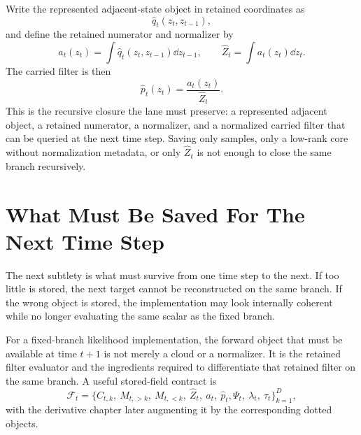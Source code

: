 Write the represented adjacent-state object in retained coordinates as
\begin{equation}
  \widehat q_t(z_t,z_{t-1}),
  \label{eq:bf-hd-squared-tt-adjacent-object}
\end{equation}
and define the retained numerator and normalizer by
\begin{equation}
  a_t(z_t)=\int \widehat q_t(z_t,z_{t-1})\dd z_{t-1},
  \qquad
  \widehat Z_t=\int a_t(z_t)\dd z_t.
  \label{eq:bf-hd-squared-tt-retained-numerator}
\end{equation}
The carried filter is then
\begin{equation}
  \widehat p_t(z_t)=\frac{a_t(z_t)}{\widehat Z_t}.
  \label{eq:bf-hd-squared-tt-carried-filter}
\end{equation}
This is the recursive closure the lane must preserve: a represented adjacent
object, a retained numerator, a normalizer, and a normalized carried filter that
can be queried at the next time step.  Saving only samples, only a low-rank core
without normalization metadata, or only \(\widehat Z_t\) is not enough to close
the same branch recursively.

\section{What Must Be Saved For The Next Time Step}
\label{sec:bf-hd-squared-tt-stored-fields}

The next subtlety is what must survive from one time step to the next.  If too
little is stored, the next target cannot be reconstructed on the same branch.  If
the wrong object is stored, the implementation may look internally coherent while
no longer evaluating the same scalar as the fixed branch.

For a fixed-branch likelihood implementation, the forward object that must be
available at time \(t+1\) is not merely a cloud or a normalizer.  It is the
retained filter evaluator and the ingredients required to differentiate that
retained filter on the same branch.  A useful stored-field contract is
\begin{equation}
  \mathcal F_t=
  \{C_{t,k},\ M_{t,>k},\ M_{t,<k},\ \widehat Z_t,\ a_t,\ \widehat p_t,
    \Psi_t,\ \lambda_t,\ \tau_t\}_{k=1}^{D},
  \label{eq:bf-hd-squared-tt-stored-forward}
\end{equation}
with the derivative chapter later augmenting it by the corresponding dotted
objects.


